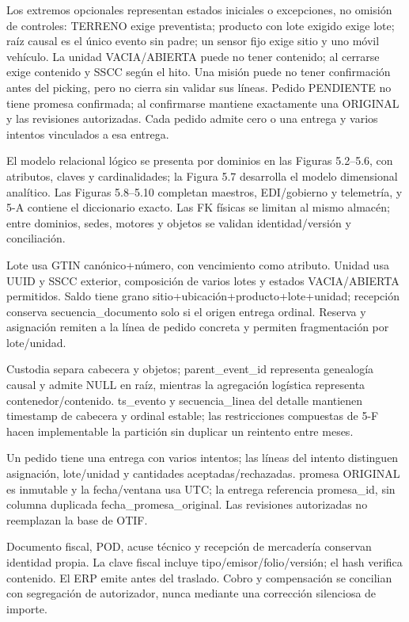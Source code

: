 Los extremos opcionales representan estados iniciales o excepciones, no omisión de controles: TERRENO exige preventista; producto con lote exigido exige lote; raíz causal es el único evento sin padre; un sensor fijo exige sitio y uno móvil vehículo. La unidad VACIA/ABIERTA puede no tener contenido; al cerrarse exige contenido y SSCC según el hito. Una misión puede no tener confirmación antes del picking, pero no cierra sin validar sus líneas. Pedido PENDIENTE no tiene promesa confirmada; al confirmarse mantiene exactamente una ORIGINAL y las revisiones autorizadas. Cada pedido admite cero o una entrega y varios intentos vinculados a esa entrega.

El modelo relacional lógico se presenta por dominios en las Figuras 5.2–5.6, con atributos, claves y cardinalidades; la Figura 5.7 desarrolla el modelo dimensional analítico. Las Figuras 5.8–5.10 completan maestros, EDI/gobierno y telemetría, y 5-A contiene el diccionario exacto. Las FK físicas se limitan al mismo almacén; entre dominios, sedes, motores y objetos se validan identidad/versión y conciliación.

Lote usa GTIN canónico+número, con vencimiento como atributo. Unidad usa UUID y SSCC exterior, composición de varios lotes y estados VACIA/ABIERTA permitidos. Saldo tiene grano sitio+ubicación+producto+lote+unidad; recepción conserva secuencia\_documento solo si el origen entrega ordinal. Reserva y asignación remiten a la línea de pedido concreta y permiten fragmentación por lote/unidad.

Custodia separa cabecera y objetos; parent\_event\_id representa genealogía causal y admite NULL en raíz, mientras la agregación logística representa contenedor/contenido. ts\_evento y secuencia\_linea del detalle mantienen timestamp de cabecera y ordinal estable; las restricciones compuestas de 5-F hacen implementable la partición sin duplicar un reintento entre meses.

Un pedido tiene una entrega con varios intentos; las líneas del intento distinguen asignación, lote/unidad y cantidades aceptadas/rechazadas. promesa ORIGINAL es inmutable y la fecha/ventana usa UTC; la entrega referencia promesa\_id, sin columna duplicada fecha\_promesa\_original. Las revisiones autorizadas no reemplazan la base de OTIF.

Documento fiscal, POD, acuse técnico y recepción de mercadería conservan identidad propia. La clave fiscal incluye tipo/emisor/folio/versión; el hash verifica contenido. El ERP emite antes del traslado. Cobro y compensación se concilian con segregación de autorizador, nunca mediante una corrección silenciosa de importe.

